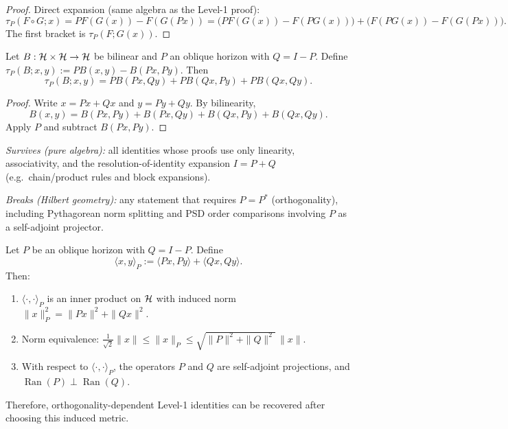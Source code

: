 \begin{proof}
Direct expansion (same algebra as the Level-1 proof):
\[
\tau_P(F\circ G;x)=PF(G(x)) - F(G(Px))
= \big(PF(G(x)) - F(PG(x))\big) + \big(F(PG(x)) - F(G(Px))\big).
\]
The first bracket is $\tau_P(F;G(x))$.
\end{proof}

\begin{proposition}
\label{prop:oblique-product-rule}
Let $B:\mathcal{H}\times \mathcal{H}\to \mathcal{H}$ be bilinear and $P$ an oblique horizon with $Q=I-P$.
Define $\tau_P(B;x,y):=PB(x,y)-B(Px,Py)$.
Then
\[
\tau_P(B;x,y) = PB(Px,Qy) + PB(Qx,Py) + PB(Qx,Qy).
\]
\end{proposition}

\begin{proof}
Write $x=Px+Qx$ and $y=Py+Qy$. By bilinearity,
\[
B(x,y)=B(Px,Py)+B(Px,Qy)+B(Qx,Py)+B(Qx,Qy).
\]
Apply $P$ and subtract $B(Px,Py)$.
\end{proof}

\begin{remark}
\label{rem:oblique-stability}
\emph{Survives (pure algebra):} all identities whose proofs use only linearity, associativity, and the resolution-of-identity expansion $I=P+Q$ (e.g.\ chain/product rules and block expansions).

\smallskip\noindent
\emph{Breaks (Hilbert geometry):} any statement that requires $P=P^\ast$ (orthogonality), including Pythagorean norm splitting and PSD order comparisons involving $P$ as a self-adjoint projector.
\end{remark}

\begin{lemma}
\label{lem:metricization}
Let $P$ be an oblique horizon with $Q=I-P$.
Define
\[
\langle x,y\rangle_{P} := \langle Px,Py\rangle + \langle Qx,Qy\rangle.
\]
Then:
\begin{enumerate}[label=(\roman*)]
\item $\langle\cdot,\cdot\rangle_P$ is an inner product on $\mathcal{H}$ with induced norm $\|x\|_P^2 = \|Px\|^2 + \|Qx\|^2$.
\item Norm equivalence: $\tfrac{1}{\sqrt{2}}\|x\| \le \|x\|_P \le \sqrt{\|P\|^2 + \|Q\|^2}\,\|x\|$.
\item With respect to $\langle\cdot,\cdot\rangle_P$, the operators $P$ and $Q$ are self-adjoint projections, and $\operatorname{Ran}(P) \perp \operatorname{Ran}(Q)$.
\end{enumerate}
Therefore, orthogonality-dependent Level-1 identities can be recovered after choosing this induced metric.
\end{lemma}

